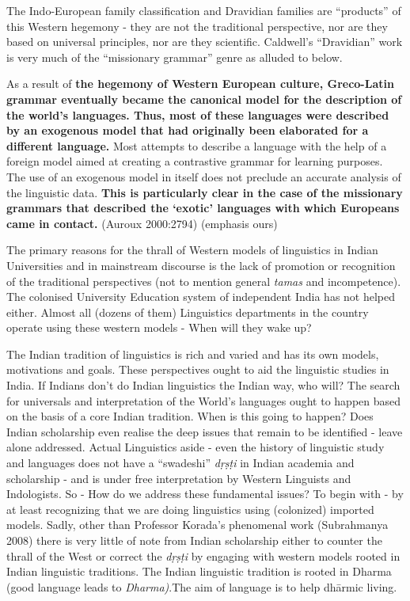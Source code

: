 The Indo-European family classification and Dravidian families are “products” of this Western hegemony - they are not the traditional perspective, nor are they based on universal principles, nor are they scientific. Caldwell’s “Dravidian” work is very much of the “missionary grammar” genre as alluded to below.

\begin{myquote}
As a result of \textbf{the hegemony of Western European culture, Greco-Latin grammar eventually became the canonical model for the description of the world’s languages. Thus, most of these languages were described by an exogenous model that had originally been elaborated for a different language.} Most attempts to describe a language with the help of a foreign model aimed at creating a contrastive grammar for learning purposes. The use of an exogenous model in itself does not preclude an accurate analysis of the linguistic data. \textbf{This is particularly clear in the case of the missionary grammars that described the ‘exotic’ languages with which Europeans came in contact.} (Auroux 2000:2794) (emphasis ours)
\end{myquote}

The primary reasons for the thrall of Western models of linguistics in Indian Universities and in mainstream discourse is the lack of promotion or recognition of the traditional perspectives (not to mention general \textit{tamas} and incompetence). The colonised University Education system of independent India has not helped either. Almost all (dozens of them) Linguistics departments in the country operate using these western models - When will they wake up?

The Indian tradition of linguistics is rich and varied and has its own models, motivations and goals. These perspectives ought to aid the linguistic studies in India. If Indians don’t do Indian linguistics the Indian way, who will? The search for universals and interpretation of the World’s languages ought to happen based on the basis of a core Indian tradition. When is this going to happen? Does Indian scholarship even realise the deep issues that remain to be identified - leave alone addressed. Actual Linguistics aside - even the history of linguistic study and languages does not have a “swadeshi” \textit{dṛṣṭi} in Indian academia and scholarship - and is under free interpretation by Western Linguists and Indologists. So - How do we address these fundamental issues? To begin with - by at least recognizing that we are doing linguistics using (colonized) imported models. Sadly, other than Professor Korada’s phenomenal work (Subrahmanya 2008) there is very little of note from Indian scholarship either to counter the thrall of the West or correct the \textit{dṛṣṭi} by engaging with western models rooted in Indian linguistic traditions. The Indian linguistic tradition is rooted in Dharma (good language leads to \textit{Dharma)}.The aim of language is to help dhārmic living.

